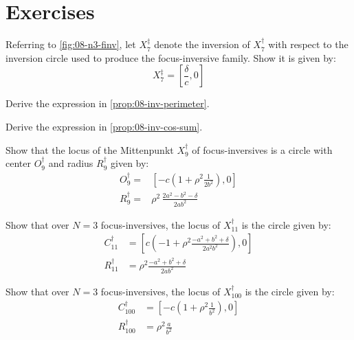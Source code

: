 \section{Exercises}

\begin{exercise}
Referring to \cref{fig:08-n3-finv}, let  $X_7^\ddagger$ denote the inversion of $X_7^\dagger$ with respect to the inversion circle used to produce the focus-inversive family. Show it is given by:
\[ X_7^\ddagger=\left[\frac{\delta}{c},0\right]\]
\label{exe:08-x7-ddagger}
\end{exercise}

\begin{exercise}
Derive the expression in \cref{prop:08-inv-perimeter}.
\end{exercise}

\begin{exercise}
Derive the expression in \cref{prop:08-inv-cos-sum}.
\end{exercise}

\begin{exercise}
Show that the locus of the Mittenpunkt  $X_9^\dagger$ of focus-inversives is a circle with center $O_9^\dagger$ and radius $R_9^\dagger$ given by:
\begin{align*}
    O_9^\dagger=&\left[-c\left(1+\rho^2 \frac{1}{2b^2}\right), 0\right] \\
    R_9^\dagger=&\rho^2\, \frac{2a^2-b^2-\delta}{2 a b^2}
\end{align*}
\label{exe:08-moving-billiard-table}
\end{exercise}

\begin{exercise}
Show that over $N=3$ focus-inversives, the locus of $X_{11}^\dagger$ is the circle given by:
\begin{align*}
C_{11}^\dagger&=\left[c\left(-1+\rho^2\frac{-a^2+b^2+\delta }{2 a^2 b^2}\right),0\right]\\
R_{11}^\dagger&=\rho^2\frac{-a^2+b^2+\delta}{2 a b^2}
\end{align*}
\end{exercise}

\begin{exercise}
Show that over $N=3$ focus-inversives, the locus of $X_{100}^\dagger$ is the circle given by:
\begin{align*}
C_{100}^\dagger&=\left[-c\left(1+\rho^2\frac{1}{b^2}\right),0\right]\\
R_{100}^\dagger&=\rho^2\frac{a}{b^2}
\end{align*}
\end{exercise}
